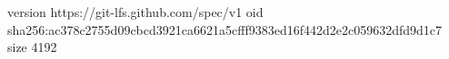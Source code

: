 version https://git-lfs.github.com/spec/v1
oid sha256:ac378c2755d09cbcd3921ca6621a5cfff9383ed16f442d2e2c059632dfd9d1c7
size 4192
